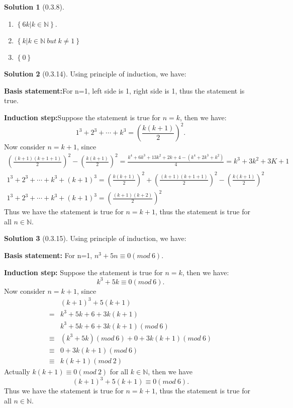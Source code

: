 \documentclass{article}
\theoremstyle{definition}
\newtheorem{sol}{Solution}[exe]
\begin{document}
\begin{sol}[0.3.8]
    \begin{enumerate}[label=(\alph*)]
        \item $\left\{6k|k\in\mathbb{N}\right\}$.
        \item $\left\{k|k\in\mathbb{N}\ but\ k\neq 1\right\}$
        \item $\left\{0\right\}$
    \end{enumerate}
\end{sol}

\begin{sol}[0.3.14]
Using principle of induction, we have:

    \noindent\textbf{Basis statement:}For n=1, left side is 1, right side is 1, thus the statement is true.

    \noindent\textbf{Induction step:}Suppose the statement is true for $n=k$, then we have:
    $$1^{3}+2^{3}+\cdots+k^{3}=(\frac{k(k+1)}{2})^{2}.$$
    Now consider $n=k+1$, since 
    \begin{align*}
        (\frac{(k+1)(k+1+1)}{2})^{2}-(\frac{k(k+1)}{2})^{2}=\frac{k^{4}+6k^{3}+13k^{2}+2k+4-(k^{4}+2k^{3}+k^{2})}{4}=k^{3}+3k^{2}+3K+1\\
        1^{3}+2^{3}+\cdots+k^{3}+(k+1)^{3}=(\frac{k(k+1)}{2})^{2}+(\frac{(k+1)(k+1+1)}{2})^{2}-(\frac{k(k+1)}{2})^{2}\\
        1^{3}+2^{3}+\cdots+k^{3}+(k+1)^{3}=(\frac{(k+1)(k+2)}{2})^{2}
    \end{align*}
    Thus we have the statement is true for $n=k+1$, thus the statement is true for all $n\in\mathbb{N}$.
\end{sol}


\begin{sol}[0.3.15]
Using principle of induction, we have:

    \noindent\textbf{Basis statement:} For n=1, $n^{3}+5n\equiv 0(mod\ 6)$.

    \noindent\textbf{Induction step:} Suppose the statement is true for $n=k$, then we have:
    $$k^{3}+5k\equiv 0(mod\ 6).$$
    Now consider $n=k+1$, since
    \begin{align*}
        &(k+1)^{3}+5(k+1)\\
        =&k^{3}+5k+6+3k(k+1)\\
        &k^{3}+5k+6+3k(k+1)(mod\ 6)\\
        \equiv &(k^{3}+5k)(mod\ 6)+0+3k(k+1)(mod\ 6)\\
        \equiv &0+3k(k+1)(mod\ 6)\\
        \equiv &k(k+1)(mod\ 2)
    \end{align*}
    Actually $k(k+1)\equiv 0(mod\ 2)$ for all $k\in \mathbb{N}$, then we have 
    $$(k+1)^{3}+5(k+1)\equiv 0(mod\ 6).$$
    Thus we have the statement is true for $n=k+1$, thus the statement is true for all $n\in\mathbb{N}$.
\end{sol}
\end{document}
